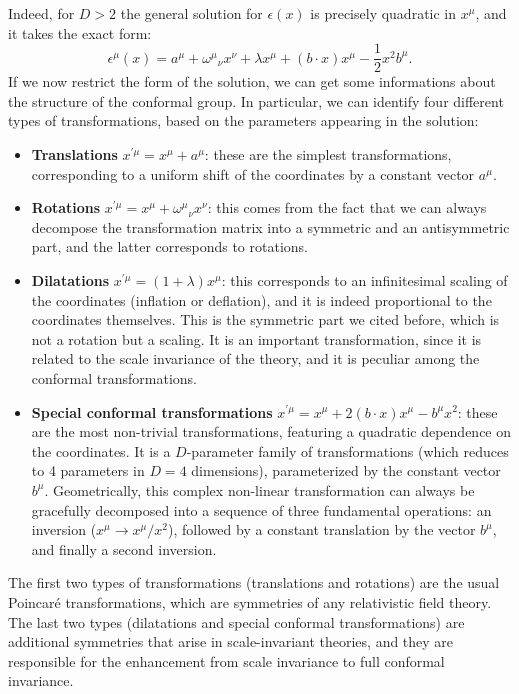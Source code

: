 Indeed, for \(D>2\) the general solution for \(\epsilon(x)\) is precisely quadratic in \(x^{\mu}\), and it takes the exact form:
\[
    \epsilon^{\mu}(x)=a^{\mu}+{\omega^{\mu}}_{\nu}x^{\nu}+\lambda x^{\mu}+(b\cdot x)x^{\mu}-\frac{1}{2}x^{2}b^{\mu}.
\]
If we now restrict the form of the solution, we can get some informations about the structure of the conformal group. In particular, we can identify four different types of transformations, based on the parameters appearing in the solution:
\begin{itemize}
    \item \textbf{Translations} \(x^{\prime\mu}=x^{\mu}+a^{\mu}\): these are the simplest transformations, corresponding to a uniform shift of the coordinates by a constant vector \(a^{\mu}\).
    \item \textbf{Rotations} \(x^{\prime\mu}=x^{\mu}+{\omega^{\mu}}_{\nu}x^{\nu}\): this comes from the fact that we can always decompose the transformation matrix into a symmetric and an antisymmetric part, and the latter corresponds to rotations.
    \item \textbf{Dilatations} \(x^{\prime\mu}=(1+\lambda)x^{\mu}\): this corresponds to an infinitesimal scaling of the coordinates (inflation or deflation), and it is indeed proportional to the coordinates themselves. This is the symmetric part we cited before, which is not a rotation but a scaling. It is an important transformation, since it is related to the scale invariance of the theory, and it is peculiar among the conformal transformations.
    \item \textbf{Special conformal transformations} \(x^{\prime\mu}=x^{\mu}+2(b\cdot x)x^{\mu}-b^{\mu}x^{2}\): these are the most non-trivial transformations, featuring a quadratic dependence on the coordinates. It is a \(D\)-parameter family of transformations (which reduces to 4 parameters in \(D=4\) dimensions), parameterized by the constant vector \(b^{\mu}\). Geometrically, this complex non-linear transformation can always be gracefully decomposed into a sequence of three fundamental operations: an inversion (\(x^{\mu} \rightarrow x^{\mu}/x^{2}\)), followed by a constant translation by the vector \(b^{\mu}\), and finally a second inversion.
\end{itemize}
The first two types of transformations (translations and rotations) are the usual Poincar\'e transformations, which are symmetries of any relativistic field theory. The last two types (dilatations and special conformal transformations) are additional symmetries that arise in scale-invariant theories, and they are responsible for the enhancement from scale invariance to full conformal invariance.


